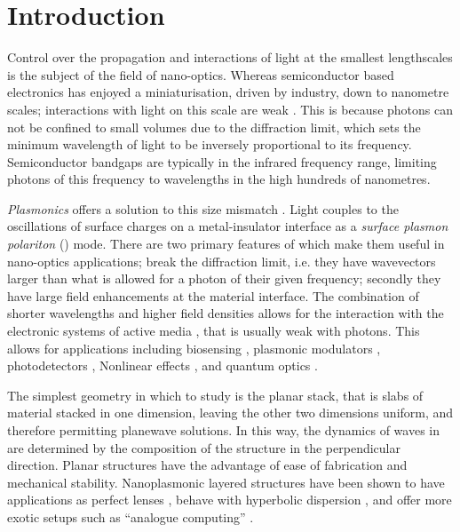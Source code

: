 \chapter{Introduction} \label{sec:intro}

Control over the propagation and interactions of light at the smallest
lengthscales is the subject of the field of nano-optics.
Whereas semiconductor based electronics has enjoyed a miniaturisation, driven by
industry, down to nanometre scales; interactions with light on this scale are
weak \cite{Dionne2010}.
This is because photons can not be confined to small volumes due to the
diffraction limit, which sets the minimum wavelength of light to be inversely
proportional to its frequency.
Semiconductor bandgaps are typically in the infrared frequency range, limiting
photons of this frequency to wavelengths in the high hundreds of nanometres.

\emph{Plasmonics} offers a solution to this size mismatch
\cite{Zayats2003,Gramotnev2010}.
Light couples to the oscillations of surface charges on a
metal-insulator interface as a \emph{surface plasmon polariton} (\spp) mode.
There are two primary features of \spps which make them useful in
nano-optics applications; \spps break the diffraction limit, i.e. they have
wavevectors larger than what is allowed for a photon of their given frequency;
secondly they have large field enhancements at the material interface.
The combination of shorter wavelengths and higher field densities allows for the
interaction with the electronic systems of active media
\cite{MacDonald2009,Hess2012},
that is usually weak with photons.
This allows for applications including
biosensing \cite{Anker2008},
plasmonic modulators \cite{Cao2009},
photodetectors \cite{Tang2008},
Nonlinear effects \cite{Kauranen2012},
and quantum optics \cite{Jacob2011,Tame2013}.

The simplest geometry in which to study \spps is the planar stack,
that is slabs of material stacked in one dimension, leaving the other two
dimensions uniform, and therefore permitting planewave solutions.
In this way, the dynamics of waves in \twod are determined by the composition of
the structure in the perpendicular direction.
Planar structures have the advantage of ease of fabrication and mechanical
stability.
Nanoplasmonic layered structures have been shown to have applications as
perfect lenses \cite{Pendry2000,Zhang2005a},
behave with hyperbolic dispersion \cite{Poddubny2013},
and offer more exotic setups such as “analogue computing” \cite{Silva2014}.

